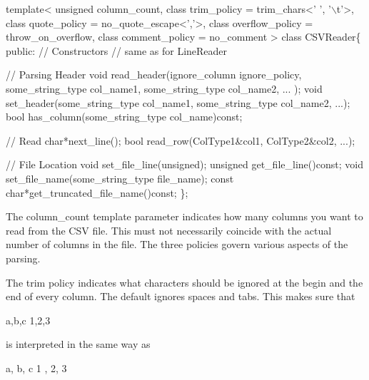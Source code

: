 \begin{DoxyCode}
\textcolor{keyword}{template}<
  \textcolor{keywordtype}{unsigned} column\_count,
  \textcolor{keyword}{class }trim\_policy = trim\_chars<' ', '\(\backslash\)t'>, 
  \textcolor{keyword}{class }quote\_policy = no\_quote\_escape<','>,
  \textcolor{keyword}{class }overflow\_policy = throw\_on\_overflow,
  \textcolor{keyword}{class }comment\_policy = no\_comment
>
\textcolor{keyword}{class }CSVReader\{
\textcolor{keyword}{public}:
  \textcolor{comment}{// Constructors}
  \textcolor{comment}{// same as for LineReader}

  \textcolor{comment}{// Parsing Header}
  \textcolor{keywordtype}{void} read\_header(ignore\_column ignore\_policy, some\_string\_type col\_name1, some\_string\_type col\_name2, ...
      );
  \textcolor{keywordtype}{void} set\_header(some\_string\_type col\_name1, some\_string\_type col\_name2, ...);
  \textcolor{keywordtype}{bool} has\_column(some\_string\_type col\_name)\textcolor{keyword}{const};

  \textcolor{comment}{// Read}
  \textcolor{keywordtype}{char}*next\_line();
  \textcolor{keywordtype}{bool} read\_row(ColType1&col1, ColType2&col2, ...);

  \textcolor{comment}{// File Location }
  \textcolor{keywordtype}{void} set\_file\_line(\textcolor{keywordtype}{unsigned});
  \textcolor{keywordtype}{unsigned} get\_file\_line()\textcolor{keyword}{const};
  \textcolor{keywordtype}{void} set\_file\_name(some\_string\_type file\_name);
  \textcolor{keyword}{const} \textcolor{keywordtype}{char}*get\_truncated\_file\_name()\textcolor{keyword}{const};
\};
\end{DoxyCode}


The {\ttfamily column\+\_\+count} template parameter indicates how many columns you want to read from the C\+SV file. This must not necessarily coincide with the actual number of columns in the file. The three policies govern various aspects of the parsing.

The trim policy indicates what characters should be ignored at the begin and the end of every column. The default ignores spaces and tabs. This makes sure that


\begin{DoxyCode}
a,b,c
1,2,3
\end{DoxyCode}


is interpreted in the same way as


\begin{DoxyCode}
  a, b,   c
1  , 2,   3
\end{DoxyCode}


